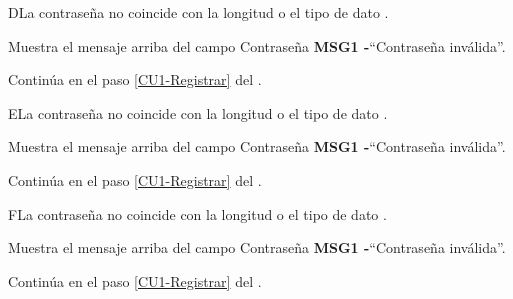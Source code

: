 		\begin{UCtrayectoriaA}{D}{La contraseña no coincide con la longitud o el tipo de dato .}
			
			\UCpaso Muestra el mensaje arriba del campo Contraseña {\bf MSG1 -}``Contraseña inválida''.
				
			\UCpaso Continúa en el paso \ref{CU1-Registrar} del .
		
	\end{UCtrayectoriaA}

	\begin{UCtrayectoriaA}{E}{La contraseña no coincide con la longitud o el tipo de dato .}
	
	\UCpaso Muestra el mensaje arriba del campo Contraseña {\bf MSG1 -}``Contraseña inválida''.
	
	\UCpaso Continúa en el paso \ref{CU1-Registrar} del .
	
\end{UCtrayectoriaA}

	\begin{UCtrayectoriaA}{F}{La contraseña no coincide con la longitud o el tipo de dato .}
	
	\UCpaso Muestra el mensaje arriba del campo Contraseña {\bf MSG1 -}``Contraseña inválida''.
	
	\UCpaso Continúa en el paso \ref{CU1-Registrar} del .
	
\end{UCtrayectoriaA}


		
		